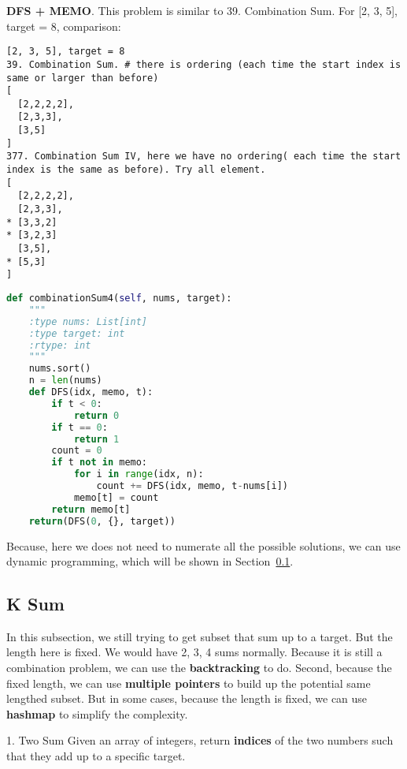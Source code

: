 \documentclass[../../question_3_array_question.tex]{subfiles}
\begin{document}
\textbf{DFS + MEMO}. This problem is similar to 39. Combination Sum. For [2, 3, 5], target = 8,  comparison:
\begin{lstlisting}
[2, 3, 5], target = 8
39. Combination Sum. # there is ordering (each time the start index is same or larger than before)
[
  [2,2,2,2],
  [2,3,3],
  [3,5]
]
377. Combination Sum IV, here we have no ordering( each time the start index is the same as before). Try all element.
[
  [2,2,2,2],
  [2,3,3],
* [3,3,2]
* [3,2,3]
  [3,5],
* [5,3]
]
\end{lstlisting}
\begin{lstlisting}[language=Python]
def combinationSum4(self, nums, target):
    """
    :type nums: List[int]
    :type target: int
    :rtype: int
    """
    nums.sort()
    n = len(nums)
    def DFS(idx, memo, t):
        if t < 0:
            return 0
        if t == 0:
            return 1
        count = 0
        if t not in memo:
            for i in range(idx, n):
                count += DFS(idx, memo, t-nums[i])
            memo[t] = count
        return memo[t]
    return(DFS(0, {}, target))
\end{lstlisting}
Because, here we does not need to numerate all the possible solutions, we can use dynamic programming, which will be shown in Section~\ref{}. 

\subsection{K Sum}
In this subsection, we still trying to get subset that sum up to a target. But the length here is fixed. We would have 2, 3, 4 sums normally. Because it is still a combination problem, we can use the \textbf{backtracking} to do. Second, because the fixed length, we can use \textbf{multiple pointers} to build up the potential same lengthed subset.  But in some cases, because the length is fixed, we can use \textbf{hashmap} to simplify the complexity. 

1. Two Sum
Given an array of integers, return \textbf{indices} of the two numbers such that they add up to a specific target.
\end{document}
